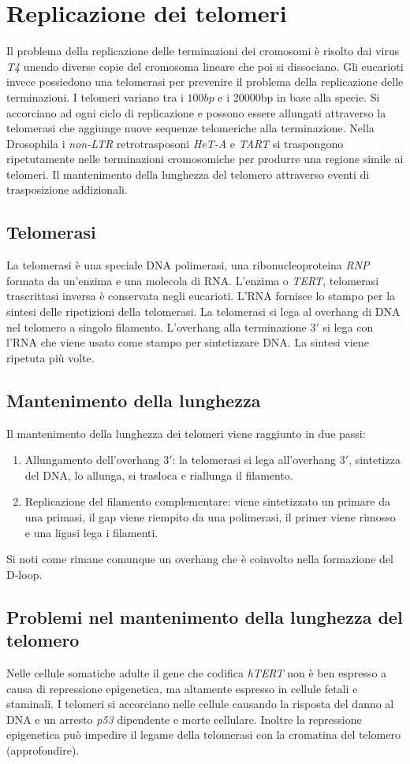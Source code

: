 \section{Replicazione dei telomeri}
Il problema della replicazione delle terminazioni dei cromosomi \`e risolto dai virus \emph{T4} unendo diverse copie del cromosoma lineare che poi si dissociano. Gli eucarioti invece
possiedono una telomerasi per prevenire il problema della replicazione delle terminazioni. I telomeri variano tra i $100bp$ e i \num{20000}\si{bp} in base alla specie. Si 
accorciano ad ogni ciclo di replicazione e possono essere allungati attraverso la telomerasi che aggiunge nuove sequenze telomeriche alla terminazione. Nella Drosophila i \emph{non-LTR}
retrotrasposoni \emph{HeT-A} e \emph{TART} si traspongono ripetutamente nelle terminazioni cromosomiche per produrre una regione simile ai telomeri. Il mantenimento della 
lunghezza del telomero attraverso eventi di trasposizione addizionali. 
\subsection{Telomerasi}
La telomerasi \`e una speciale DNA polimerasi, una ribonucleoproteina \emph{RNP} formata da un'enzima e una molecola di RNA. L'enzima o \emph{TERT}, telomerasi trascrittasi inversa
\`e conservata negli eucarioti. L'RNA fornisce lo stampo per la sintesi delle ripetizioni della telomerasi. La telomerasi si lega al overhang di DNA nel telomero a singolo filamento. 
L'overhang alla terminazione $3'$ si lega con l'RNA che viene usato come stampo per sintetizzare DNA. La sintesi viene ripetuta pi\`u volte. 
\subsection{Mantenimento della lunghezza}
Il mantenimento della lunghezza dei telomeri viene raggiunto in due passi:
\begin{enumerate}
	\item Allungamento dell'overhang $3'$: la telomerasi si lega all'overhang $3'$, sintetizza del DNA, lo allunga, si trasloca e riallunga il filamento.
	\item Replicazione del filamento complementare: viene sintetizzato un primare da una primasi, il gap viene riempito da una polimerasi, il primer viene rimosso e una ligasi 
		lega i filamenti.
\end{enumerate}
Si noti come rimane comunque un overhang che \`e coinvolto nella formazione del D-loop. 
\subsection{Problemi nel mantenimento della lunghezza del telomero}
Nelle cellule somatiche adulte il gene che codifica \emph{hTERT} non \`e ben espresso a causa di repressione epigenetica, ma altamente espresso in cellule fetali e staminali. I telomeri
si accorciano nelle cellule causando la risposta del danno al DNA e un arresto \emph{p53} dipendente e morte cellulare. Inoltre la repressione epigenetica pu\`o impedire il 
legame della telomerasi con la cromatina del telomero (approfondire). 
